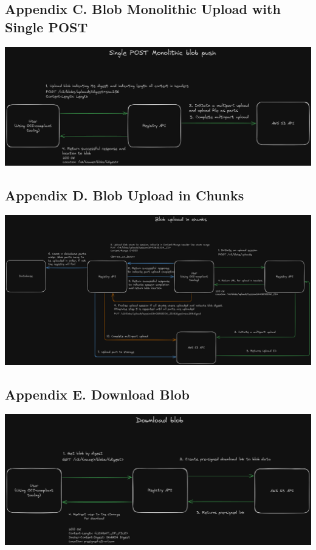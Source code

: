 \documentclass{article}
\begin{document}
  \subsection{Appendix C. Blob Monolithic Upload with Single POST}
  \label{sec:appendix-c}

  \includegraphics[scale=0.25]{appendix/blob-single-post-upload.png}

  \subsection{Appendix D. Blob Upload in Chunks}
  \label{sec:appendix-d}

  \includegraphics[scale=0.20]{appendix/blob-upload-in-chunks.png}

  \subsection{Appendix E. Download Blob}
  \label{sec:appendix-e}

  \includegraphics[scale=0.25]{appendix/download-blob.png}
\end{document}
